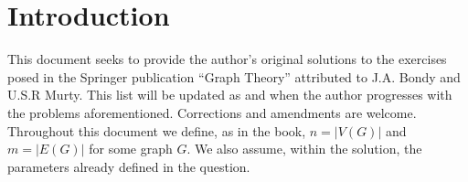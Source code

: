 \section*{Introduction}
This document seeks to provide the author's original solutions to the exercises posed in the Springer publication ``Graph Theory'' attributed to J.A. Bondy and U.S.R Murty. This list will be updated as and when the author progresses with the problems aforementioned. Corrections and amendments are welcome. \\

Throughout this document we define, as in the book, $n = |V(G)|$ and $m = |E(G)|$ for some graph $G$. We also assume, within the solution, the parameters already defined in the question.